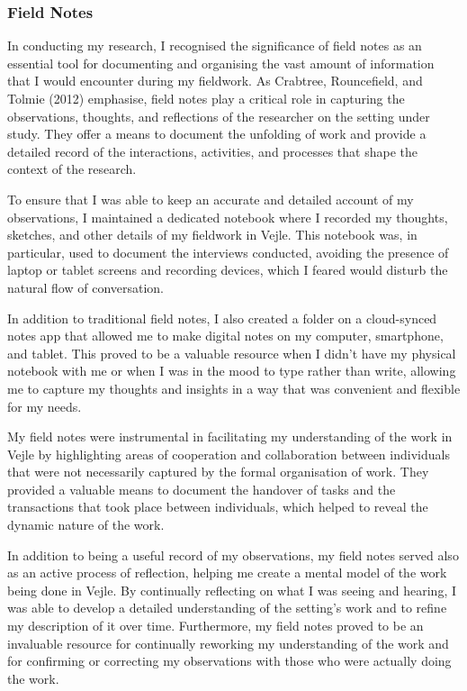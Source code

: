 \documentclass[
]{book}
\begin{document}
\hypertarget{field-notes-1}{%
\subsubsection{Field Notes}\label{field-notes-1}}

In conducting my research, I recognised the significance of field notes as an essential tool for documenting and organising the vast amount of information that I would encounter during my fieldwork. As Crabtree, Rouncefield, and Tolmie (2012) emphasise, field notes play a critical role in capturing the observations, thoughts, and reflections of the researcher on the setting under study. They offer a means to document the unfolding of work and provide a detailed record of the interactions, activities, and processes that shape the context of the research.

To ensure that I was able to keep an accurate and detailed account of my observations, I maintained a dedicated notebook where I recorded my thoughts, sketches, and other details of my fieldwork in Vejle. This notebook was, in particular, used to document the interviews conducted, avoiding the presence of laptop or tablet screens and recording devices, which I feared would disturb the natural flow of conversation.

In addition to traditional field notes, I also created a folder on a cloud-synced notes app that allowed me to make digital notes on my computer, smartphone, and tablet. This proved to be a valuable resource when I didn't have my physical notebook with me or when I was in the mood to type rather than write, allowing me to capture my thoughts and insights in a way that was convenient and flexible for my needs.

My field notes were instrumental in facilitating my understanding of the work in Vejle by highlighting areas of cooperation and collaboration between individuals that were not necessarily captured by the formal organisation of work. They provided a valuable means to document the handover of tasks and the transactions that took place between individuals, which helped to reveal the dynamic nature of the work.

In addition to being a useful record of my observations, my field notes served also as an active process of reflection, helping me create a mental model of the work being done in Vejle. By continually reflecting on what I was seeing and hearing, I was able to develop a detailed understanding of the setting's work and to refine my description of it over time. Furthermore, my field notes proved to be an invaluable resource for continually reworking my understanding of the work and for confirming or correcting my observations with those who were actually doing the work.
\end{document}

